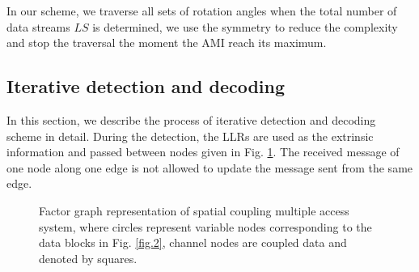 \documentclass[conference]{IEEEtran}
\begin{document}
In our scheme, we traverse all sets of rotation angles when the total number of data streams $LS$ is determined, we use the symmetry to reduce the complexity and stop the traversal the moment the AMI reach its maximum.
\subsection{Iterative detection and decoding}
In this section, we describe the process of iterative detection and decoding scheme in detail. During the detection, the LLRs are used as the extrinsic information and passed between nodes given in Fig. \ref{fig.5}. The received message of one node along one edge is not allowed to update the message sent from the same edge.

\begin{figure}[h!]
\setlength{\abovecaptionskip}{0.cm}
\setlength{\belowcaptionskip}{-0.cm}
  \caption{Factor graph representation of spatial coupling multiple access system, where circles represent variable nodes corresponding to the data blocks in Fig. \ref{fig.2}, channel nodes are coupled data and denoted by squares.}\label{fig.5}
    \vspace{-1em}
\end{figure}
\end{document}
